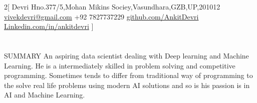 \documentclass{my_cv}
\begin{document}
\begin{multicols}{2}[
        {Devri}%
        {Hno.377/5,Mohan Mikins Sociey,Vasundhara,GZB,UP,201012}%
        {\href{mailto:first.last@mail.com}{vivekdevri@gmail.com}}%
        {+92 7827737229}%
        {\href{https://github.com/AnkitDevri/}{github.com/AnkitDevri}}%
        {\href{https://www.linkedin.com/in/ankitdevri/}{Linkedin.com/in/ankitdevri}}%
        {}
]
\end{multicols}

\section{\faFileText}{SUMMARY}
An aspiring data scientist dealing with Deep learning and Machine Learning.
He is a intermediately skilled in problem solving and competitive programming. Sometimes tends to differ from traditional way of programming to the solve real life problems using modern AI solutions and so is
his passion is in AI and Machine Learning.
\end{document}
